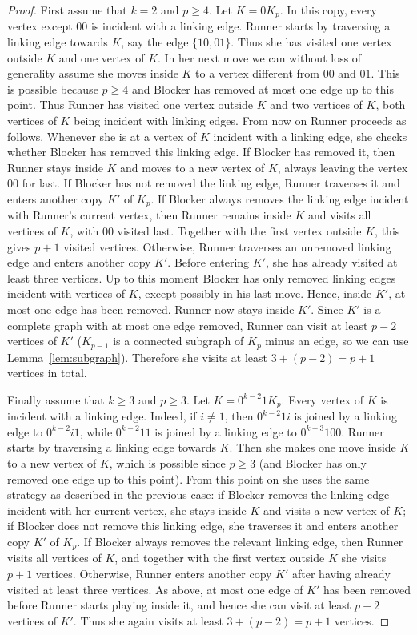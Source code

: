 \documentclass[12pt]{article}
\begin{document}
\begin{proof}
First assume that $k=2$ and $p\ge 4$. Let $K=0K_p$. In this copy, every vertex except $00$ is incident with a linking edge. Runner starts by traversing a linking edge towards $K$, say the edge $\{10,01\}$. Thus she has visited one vertex outside $K$ and one vertex of $K$. In her next move we can without loss of generality assume she moves inside $K$ to a vertex different from $00$ and $01$. This is possible because $p\ge 4$ and Blocker has removed at most one edge up to this point. Thus Runner has visited one vertex outside $K$ and two vertices of $K$, both vertices of $K$ being incident with linking edges. From now on Runner proceeds as follows. Whenever she is at a vertex of $K$ incident with a linking edge, she checks whether Blocker has removed this linking edge. If Blocker has removed it, then Runner stays inside $K$ and moves to a new vertex of $K$, always leaving the vertex $00$ for last. If Blocker has not removed the linking edge, Runner traverses it and enters another copy $K'$ of $K_p$. If Blocker always removes the linking edge incident with Runner's current vertex, then Runner remains inside $K$ and visits all vertices of $K$, with $00$ visited last. Together with the first vertex outside $K$, this gives $p+1$ visited vertices. Otherwise, Runner traverses an unremoved linking edge and enters another copy $K'$. Before entering $K'$, she has already visited at least three vertices. Up to this moment Blocker has only removed linking edges incident with vertices of $K$, except possibly in his last move. Hence, inside $K'$, at most one edge has been removed. Runner now stays inside $K'$. Since $K'$ is a complete graph with at most one edge removed, Runner can visit at least $p-2$ vertices of $K'$ ($K_{p-1}$ is a connected subgraph of $K_p$ minus an edge, so we can use Lemma~\ref{lem:subgraph}). Therefore she visits at least
$3+(p-2)=p+1$ vertices in total.

Finally assume that $k\ge 3$ and $p\ge 3$. Let $K=0^{k-2}1K_p$. Every vertex of $K$ is incident with a linking edge. Indeed, if $i\ne 1$, then $0^{k-2}1i$ is joined by a linking edge to $0^{k-2}i1$, while $0^{k-2}11$ is
joined by a linking edge to $0^{k-3}100$. Runner starts by traversing a linking edge towards $K$. Then she makes one move inside $K$ to a new vertex of $K$, which is possible since $p\ge 3$ (and Blocker has only removed one edge up to this point). From this point on she uses the same strategy as described in the previous case: if Blocker removes the linking edge incident with her current vertex, she stays inside $K$ and visits a new vertex of $K$; if Blocker does not remove this linking edge, she traverses it and enters another copy $K'$ of $K_p$. If Blocker always removes the relevant linking edge, then Runner visits all vertices of $K$, and together with the first vertex outside $K$ she visits $p+1$ vertices. Otherwise, Runner enters another copy $K'$ after having already visited at least three vertices. As above, at most one edge of $K'$ has been removed before Runner starts playing inside it, and hence she can visit at least $p-2$ vertices of $K'$. Thus she again visits at least $3+(p-2)=p+1$ vertices.


\end{proof}
\end{document}
